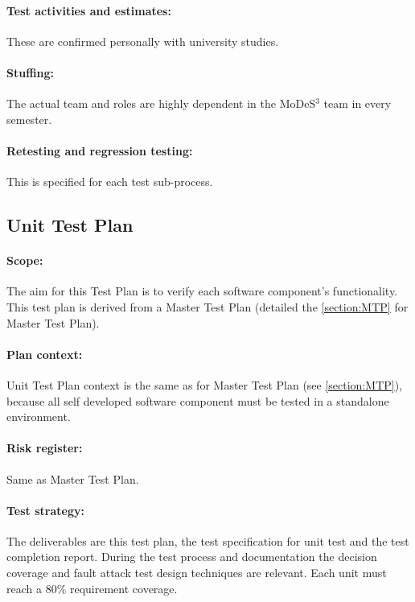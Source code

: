 \paragraph{Test activities and estimates:} These are confirmed personally with university studies.
\paragraph{Stuffing:} The actual team and roles are highly dependent in the MoDeS$^3$ team in every semester.
\paragraph{Retesting and regression testing:} This is specified for each test sub-process.



\subsection{Unit Test Plan}
\paragraph{Scope:} The aim for this Test Plan is to verify each software component's functionality. This test plan is derived from a Master Test Plan (detailed the \autoref{section:MTP} for Master Test Plan). 
\paragraph{Plan context:} Unit Test Plan context is the same as for Master Test Plan (see \autoref{section:MTP}), because all self developed software component must be tested in a standalone environment. 
\paragraph{Risk register:} Same as Master Test Plan.
\paragraph{Test strategy:} The deliverables are this test plan, the test specification for unit test and the test completion report. 
During the test process and documentation the decision coverage and fault attack test design techniques are relevant.
Each unit must reach a 80\%  requirement coverage. 

